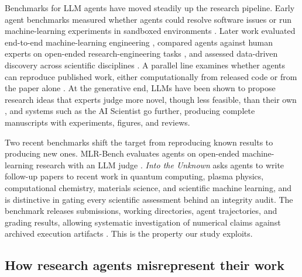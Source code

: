 \documentclass[preprint,12pt,authoryear]{elsarticle}
\begin{document}
Benchmarks for LLM agents have moved steadily up the research pipeline. Early agent benchmarks measured whether agents could resolve software issues \citep{jimenez2024swebench} or run machine-learning experiments in sandboxed environments \citep{huang2024mlagentbench}. Later work evaluated end-to-end machine-learning engineering \citep{chan2025mlebench}, compared agents against human experts on open-ended research-engineering tasks \citep{wijk2024rebench}, and assessed data-driven discovery across scientific disciplines \citep{chen2025scienceagentbench,jansen2024discoveryworld}. A parallel line examines whether agents can reproduce published work, either computationally from released code \citep{siegel2024corebench} or from the paper alone \citep{starace2025paperbench}. At the generative end, LLMs have been shown to propose research ideas that experts judge more novel, though less feasible, than their own \citep{si2025ideas}, and systems such as the AI Scientist \citep{lu2024aiscientist,yamada2025aiscientistv2} go further, producing complete manuscripts with experiments, figures, and reviews.

Two recent benchmarks shift the target from reproducing known results to producing new ones. MLR-Bench evaluates agents on open-ended machine-learning research with an LLM judge \citep{chen2025mlrbench}. \emph{Into the Unknown} \citep{kim2026unknown} asks agents to write follow-up papers to recent work in quantum computing, plasma physics, computational chemistry, materials science, and scientific machine learning, and is distinctive in gating every scientific assessment behind an integrity audit. The benchmark releases submissions, working directories, agent trajectories, and grading results, allowing systematic investigation of numerical claims against archived execution artifacts \citep{kim2026unknown}. This is the property our study exploits.

\subsection{How research agents misrepresent their work}\label{sec:rw-integrity}
\end{document}
